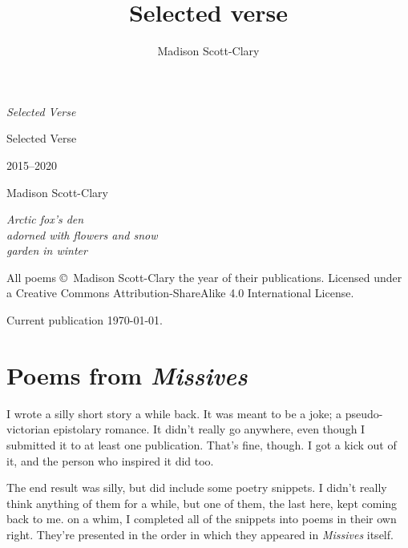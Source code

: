 \documentclass[10pt]{memoir}
\title{Selected verse}
\author{Madison Scott-Clary}
\date{}
\begin{document}
  \frontmatter
  \pagestyle{empty}
  \null
  \vfill

  \hfill\textit{Selected Verse}

  \vfill
  \cleardoublepage
  \null
  \vfill
  \begin{raggedleft}
    {\Huge Selected Verse}

    {\Large 2015--2020}

    \vspace{0.4in}

    {\Large Madison Scott-Clary}

    \vfill

    {\pfdfamily\itshape
    Arctic fox's den\\
    adorned with flowers and snow\\
    garden in winter}

  \end{raggedleft}
  \newpage
  \null
  \vfill

  {\small
  \noindent All poems \copyright\ Madison Scott-Clary the year of their publications. Licensed under a Creative Commons Attribution-ShareAlike 4.0 International License.

  \vspace{0.25in}

  \noindent Current publication \today.
  }

  \vfill
  \newpage
  \tableofcontents*
  \thispagestyle{empty}

  \mainmatter

  \onehalfspacing

  \pagestyle{fancyplain}

  \chapter{Poems from \textit{Missives}}

  I wrote a silly short story a while back. It was meant to be a joke; a pseudo-victorian epistolary romance. It didn't really go anywhere, even though I submitted it to at least one publication. That's fine, though. I got a kick out of it, and the person who inspired it did too.

  The end result was silly, but did include some poetry snippets. I didn't really think anything of them for a while, but one of them, the last here, kept coming back to me. on a whim, I completed all of the snippets into poems in their own right. They're presented in the order in which they appeared in \textit{Missives} itself.
  \thispagestyle{empty}
  \newpage
\end{document}
